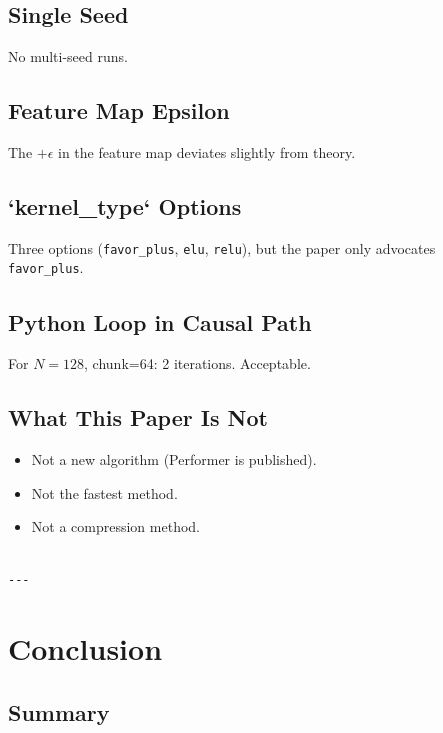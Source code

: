 \subsection{Single Seed}

No multi-seed runs.

\subsection{Feature Map Epsilon}

The $+\epsilon$ in the feature map deviates slightly from theory.

\subsection{`kernel\_type` Options}

Three options (\texttt{favor\_plus}, \texttt{elu}, \texttt{relu}), but the paper only advocates 
\texttt{favor\_plus}.

\subsection{Python Loop in Causal Path}

For $N = 128$, chunk=64: 2 iterations. Acceptable.

\subsection{What This Paper Is Not}

\begin{itemize}
\item Not a new algorithm (Performer is published).
\item Not the fastest method.
\item Not a compression method.
\end{itemize}
\begin{lstlisting}

---
\end{lstlisting}


\section{Conclusion}

\subsection{Summary}

